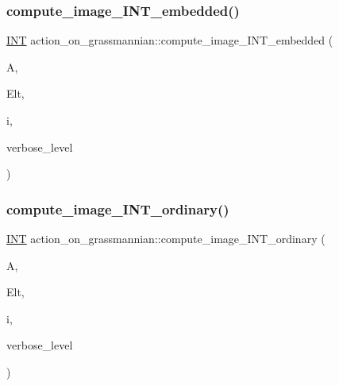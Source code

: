 \mbox{\label{classaction__on__grassmannian_a908326fb7f7f50abca9d91de288af660}} 
\subsubsection{\texorpdfstring{compute\+\_\+image\+\_\+\+I\+N\+T\+\_\+embedded()}{compute\_image\_INT\_embedded()}}
{\footnotesize\ttfamily \mbox{\hyperlink{galois_8h_a09fddde158a3a20bd2dcadb609de11dc}{I\+NT}} action\+\_\+on\+\_\+grassmannian\+::compute\+\_\+image\+\_\+\+I\+N\+T\+\_\+embedded (\begin{DoxyParamCaption}\item[{\mbox{\hyperlink{classaction}{action}} $\ast$}]{A,  }\item[{\mbox{\hyperlink{galois_8h_a09fddde158a3a20bd2dcadb609de11dc}{I\+NT}} $\ast$}]{Elt,  }\item[{\mbox{\hyperlink{galois_8h_a09fddde158a3a20bd2dcadb609de11dc}{I\+NT}}}]{i,  }\item[{\mbox{\hyperlink{galois_8h_a09fddde158a3a20bd2dcadb609de11dc}{I\+NT}}}]{verbose\+\_\+level }\end{DoxyParamCaption})}

\mbox{\label{classaction__on__grassmannian_a0699e1d9ac13d0d97c5d1187846e5840}} 
\subsubsection{\texorpdfstring{compute\+\_\+image\+\_\+\+I\+N\+T\+\_\+ordinary()}{compute\_image\_INT\_ordinary()}}
{\footnotesize\ttfamily \mbox{\hyperlink{galois_8h_a09fddde158a3a20bd2dcadb609de11dc}{I\+NT}} action\+\_\+on\+\_\+grassmannian\+::compute\+\_\+image\+\_\+\+I\+N\+T\+\_\+ordinary (\begin{DoxyParamCaption}\item[{\mbox{\hyperlink{classaction}{action}} $\ast$}]{A,  }\item[{\mbox{\hyperlink{galois_8h_a09fddde158a3a20bd2dcadb609de11dc}{I\+NT}} $\ast$}]{Elt,  }\item[{\mbox{\hyperlink{galois_8h_a09fddde158a3a20bd2dcadb609de11dc}{I\+NT}}}]{i,  }\item[{\mbox{\hyperlink{galois_8h_a09fddde158a3a20bd2dcadb609de11dc}{I\+NT}}}]{verbose\+\_\+level }\end{DoxyParamCaption})}

